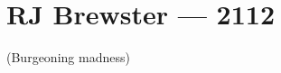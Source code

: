 \hypertarget{rj-brewster-2112}{%
\chapter*{RJ Brewster — 2112}\label{rj-brewster-2112}}

(Burgeoning madness)
